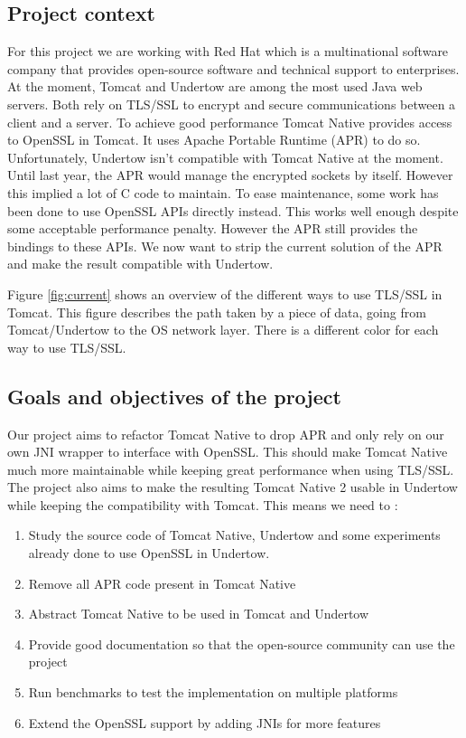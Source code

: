 \documentclass[11pt,a4paper,bibliography=totocnumbered]{scrartcl}
\def\mytitle{Tomcat Native 2}
\def\theclient{Red Hat}
\begin{document}
\subsection{Project context}
For this project we are working with \theclient{} which is a multinational software company that provides open-source software and technical support to enterprises\autocite{redhat}.
At the moment, Tomcat\autocite{tomcat} and Undertow\autocite{undertow} are among the most used Java web servers. Both rely on TLS/SSL to encrypt and secure communications between a client and a server. To achieve good performance Tomcat Native\autocite{tomcat-native} provides access to OpenSSL in Tomcat. It uses Apache Portable Runtime (APR) to do so. 
Unfortunately, Undertow isn't compatible with Tomcat Native at the moment.
Until last year, the APR would manage the encrypted sockets by itself. However this implied a lot of C code to maintain. To ease maintenance, some work has been done to use OpenSSL APIs directly instead. This works well enough despite some acceptable performance penalty. However the APR still provides the bindings to these APIs.
We now want to strip the current solution of the APR and make the result compatible with Undertow.

Figure \ref{fig:current} shows an overview of the different ways to use TLS/SSL in Tomcat. This figure describes the path taken by a piece of data, going from Tomcat/Undertow to the OS network layer. There is a different color for each way to use TLS/SSL.

\subsection{Goals and objectives of the project}

Our project aims to refactor Tomcat Native to drop APR and only rely on our own JNI wrapper to interface with OpenSSL. This should make Tomcat Native much more maintainable while keeping great performance when using TLS/SSL. The project also aims to make the resulting \mytitle{} usable in Undertow while keeping the compatibility with Tomcat.
This means we need to :
\begin{enumerate}
\item Study the source code of Tomcat Native, Undertow and some experiments already done to use OpenSSL in Undertow.
\item Remove all APR code present in Tomcat Native
\item Abstract Tomcat Native to be used in Tomcat and Undertow
\item Provide good documentation so that the open-source community can use the project
\item Run benchmarks to test the implementation on multiple platforms
\item Extend the OpenSSL support by adding JNIs for more features
\end{enumerate}
\end{document}

